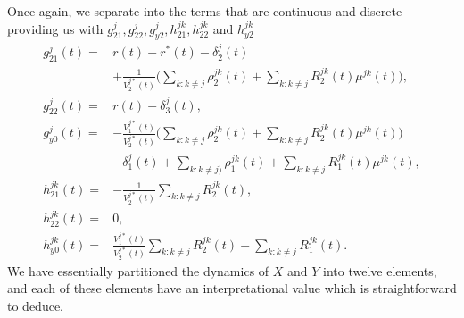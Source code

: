 \documentclass[12pt]{article}
\theoremstyle{my_thm}
\begin{document}
Once again, we separate into the terms that are continuous and discrete providing us with
$g_{21}^j,g_{22}^j,g_{y2}^j,h_{21}^{jk},h_{22}^{jk}$ and $h_{y2}^{jk}$
\begin{align*}
g^j_{21}(t)=&
r(t)-r^*(t)-\delta_2^{j}(t)
\\
& + \frac{1}{V_2^{j*}(t)} \bigg( 
\sum_{k:k\neq j} \rho_2^{jk}(t)
+\sum_{k:k \neq j}  R^{jk}_2(t) \mu^{jk}(t) 
\bigg),
\\
g^j_{22}(t)=& r(t) -\delta_3^{j}(t),
\\
g^j_{y0}(t)=& - \frac{V_1^{j*}(t)}{V_2^{j*}(t)}\bigg(
\sum_{k:k\neq j} \rho^{jk}_2(t) 
 +\sum_{k:k\neq j} R^{jk}_2(t) \mu^{jk}(t) 
\bigg)
\\
&-\delta_1^{j}(t)
+
\sum_{k:k\neq j)} \rho^{jk}_1(t) 
+\sum_{k:k \neq j}  R_1^{jk}(t) \mu^{jk}(t) ,
\\
h^{jk}_{21}(t)=& 
- \frac{1}{V_2^{j*}(t)} \sum_{k:k \neq j}  R^{jk}_2(t),
\\
h^{jk}_{22}(t)=& 0,
\\
h^{jk}_{y0}(t)=& \frac{V_1^{j*}(t)}{V_2^{j*}(t)}
\sum_{k:k\neq j} R^{jk}_2(t) 
-
\sum_{k:k \neq j}  R_1^{jk}(t).
\end{align*}
We have essentially partitioned the dynamics of $X$ and $Y$ into twelve elements, and each of these elements have an interpretational value which is straightforward to deduce.



\newpage


\end{document}

